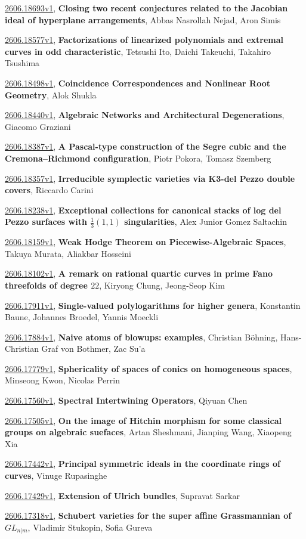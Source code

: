 \documentclass[9pt, a4paper]{article}
\theoremstyle{plain}
\theoremstyle{definition}
\theoremstyle{remark}
\newcommand{\arxiv}[3]{\href{https://arxiv.org/abs/#1}{#1}, \textbf{\textcolor{arxivblue}{#2}}, #3}
\begin{document}
\arxiv{2606.18693v1}{Closing two recent conjectures related to the Jacobian ideal of hyperplane arrangements}{Abbas Nasrollah Nejad, Aron Simis}

\arxiv{2606.18577v1}{Factorizations of linearized polynomials and extremal curves in odd characteristic}{Tetsushi Ito, Daichi Takeuchi, Takahiro Tsushima}

\arxiv{2606.18498v1}{Coincidence Correspondences and Nonlinear Root Geometry}{Alok Shukla}

\arxiv{2606.18440v1}{Algebraic Networks and Architectural Degenerations}{Giacomo Graziani}

\arxiv{2606.18387v1}{A Pascal-type construction of the Segre cubic and the Cremona--Richmond configuration}{Piotr Pokora, Tomasz Szemberg}

\arxiv{2606.18357v1}{Irreducible symplectic varieties via K3-del Pezzo double covers}{Riccardo Carini}

\arxiv{2606.18238v1}{Exceptional collections for canonical stacks of log del Pezzo surfaces with $\frac13(1,1)$ singularities}{Alex Junior Gomez Saltachin}

\arxiv{2606.18159v1}{Weak Hodge Theorem on Piecewise-Algebraic Spaces}{Takuya Murata, Aliakbar Hosseini}

\arxiv{2606.18102v1}{A remark on rational quartic curves in prime Fano threefolds of degree $22$}{Kiryong Chung, Jeong-Seop Kim}

\arxiv{2606.17911v1}{Single-valued polylogarithms for higher genera}{Konstantin Baune, Johannes Broedel, Yannis Moeckli}

\arxiv{2606.17884v1}{Naive atoms of blowups: examples}{Christian Böhning, Hans-Christian Graf von Bothmer, Zac Su'a}

\arxiv{2606.17779v1}{Sphericality of spaces of conics on homogeneous spaces}{Minseong Kwon, Nicolas Perrin}

\arxiv{2606.17560v1}{Spectral Intertwining Operators}{Qiyuan Chen}

\arxiv{2606.17505v1}{On the image of Hitchin morphism for some classical groups on algebraic suefaces}{Artan Sheshmani, Jianping Wang, Xiaopeng Xia}

\arxiv{2606.17442v1}{Principal symmetric ideals in the coordinate rings of curves}{Vinuge Rupasinghe}

\arxiv{2606.17429v1}{Extension of Ulrich bundles}{Supravat Sarkar}

\arxiv{2606.17318v1}{Schubert varieties for the super affine Grassmannian of $GL_{n|m}$}{Vladimir Stukopin, Sofia Gureva}
\end{document}
